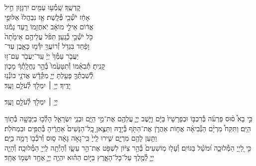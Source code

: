 \documentclass[twoside, openany, parskip=half, 11pt]{book}
\begin{document}
קׇדְשֶֽׁךָ׃ \hfill שָֽׁמְ֯ע֥וּ עַמִּ֖ים יִרְגָּז֑וּן \hfill חִ֣יל \\
אָחַ֔ז יֹשְׁ֯בֵ֖י פְּ֯לָֽשֶׁת׃ \hfill אָ֤ז נִבְהֲלוּ֙ אַלּוּפֵ֣י \\
אֱד֔וֹם \hfill אֵילֵ֣י מוֹאָ֔ב יֹֽאחֲזֵ֖מוֹ רָ֑עַד \hfill נָמֹ֕גוּ \\
כֹּ֖ל יֹשְׁ֯בֵ֥י כְ֯נָֽעַן׃ \hfill תִּפֹּ֨ל עֲלֵיהֶ֤ם אֵימָ֙תָה֙ \\
וָפַ֔חַד \hfill בִּגְדֹ֥ל זְ֯רוֹעֲךָ֖ יִדְּ֯מ֣וּ כָּאָ֑בֶן \hfill עַד־\\
יַעֲבֹ֤ר עַמְּ֯ךָ֙ יְיָ֔ \hfill עַֽד־יַעֲבֹ֖ר עַם־ז֥וּ \\
קָנִֽיתָ׃ \hfill תְּ֯בִאֵ֗מוֹ וְ֯תִטָּעֵ֙מוֹ֙ בְּ֯הַ֣ר נַחֲלָֽתְ֯ךָ֔ \hfill מָכ֧וֹן \\
לְ֯שִׁבְתְּ֯ךָ֛ פָּעַ֖לְתָּ יְיָ֑ \hfill מִקְּ֯דָ֕שׁ אֲדֹנָ֖י כּוֹנְ֯נ֥וּ \\
יָדֶֽיךָ׃ \hfill יְיָ֥ ׀ יִמְלֹ֖ךְ לְ֯עֹלָ֥ם וָעֶֽד׃\hfill \break
\begin{small}
יְיָ֥ ׀ יִמְלֹ֖ךְ לְ֯עֹלָ֥ם וָעֶֽד׃\\
\end{small}
כִּ֣י בָא֩ ס֨וּס פַּרְעֹ֜ה בְּ֯רִכְבּ֤וֹ וּבְפָרָשָׁיו֙ בַּיָּ֔ם וַיָּ֧שֶׁב יְיָ֛ עֲלֵהֶ֖ם אֶת־מֵ֣י הַיָּ֑ם וּבְנֵ֧י יִשְׂרָאֵ֛ל הָלְ֯כ֥וּ בַיַּבָּשָׁ֖ה בְּ֯ת֥וֹךְ הַיָּֽם׃ וַתִּקַּח֩ מִרְיָ֨ם הַנְּ֯בִיאָ֜ה אֲח֧וֹת אַהֲרֹ֛ן אֶת־הַתֹּ֖ף בְּ֯יָדָ֑הּ וַתֵּצֶ֤אןָ כׇֽל־הַנָּשִׁים֙ אַחֲרֶ֔יהָ בְּ֯תֻפִּ֖ים וּבִמְחֹלֹֽת׃ וַתַּ֥עַן לָהֶ֖ם מִרְיָ֑ם שִׁ֤ירוּ לַֽייָ֙ כִּֽי־גָאֹ֣ה גָּאָ֔ה ס֥וּס וְ֯רֹכְ֯ב֖וֹ רָמָ֥ה בַיָּֽם׃
\\
כִּ֣י לַ֭ייָ֭ הַמְּ֯לוּכָ֑ה וּ֝מֹשֵׁ֗ל בַּגּוֹיִֽם׃
וְ֯עָל֤וּ מֽוֹשִׁעִים֙ בְּ֯הַ֣ר צִיּ֔וֹן לִשְׁפֹּ֖ט אֶת־הַ֣ר עֵשָׂ֑ו וְ֯הָיְ֯תָ֥ה לַֽייָ֖ הַמְּ֯לוּכָֽה׃
וְ֯הָיָ֧ה יְיָ֛ לְ֯מֶ֖לֶךְ עַל־כׇּל־הָאָ֑רֶץ בַּיּ֣וֹם הַה֗וּא יִהְיֶ֧ה יְיָ֛ אֶחָ֖ד וּשְׁמ֥וֹ אֶחָֽד׃

\end{document}
